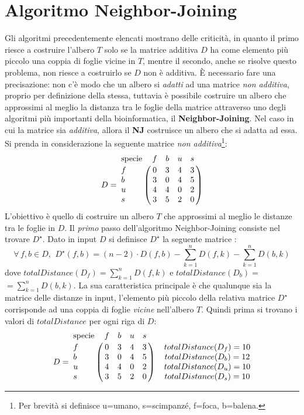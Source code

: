 \newpage

\section{Algoritmo Neighbor-Joining}
Gli algoritmi precedentemente elencati mostrano delle criticità, in quanto il primo riesce a costruire l'albero $T$ solo se la matrice additiva $D$ ha come elemento più piccolo una coppia di foglie vicine in $T$, mentre il secondo, anche se risolve questo problema, non riesce a costruirlo se $D$ non è additiva.
\newline
\`E necessario fare una precisazione: non c'è modo che un albero si \textit{adatti} ad una matrice \textit{non additiva}, proprio per definizione della stessa, tuttavia è possibile costruire un albero che approssimi al meglio la distanza tra le foglie della matrice attraverso uno degli algoritmi più importanti della bioinformatica, il \textbf{Neighbor-Joining}. Nel caso in cui la matrice sia \textit{additiva}, allora il \textbf{NJ} costruisce un albero che si adatta ad essa.
\newline
Si prenda in considerazione la seguente matrice \textit{non additiva}\footnote{Per brevità si definisce u=umano, s=scimpanzé, f=foca, b=balena.}:
\[
D = \bordermatrix{\text{specie}&f&b&u&s\cr
                f& 0 & 3 & 4 & 3\cr
                b& 3 & 0 & 4 & 5\cr
                u& 4 & 4 & 0 & 2\cr
                s& 3 & 5 & 2 & 0}
\]
L'obiettivo è quello di costruire un albero $T$ che approssimi al meglio le distanze tra le foglie in $D$.
\newline
Il \textit{primo} passo dell'algoritmo Neighbor-Joining consiste nel trovare $D^\star$. Dato in input $D$ si definisce $D^\star$ la seguente matrice \cite{neighborjoinrevealed}:
\[\forall \,f,b\in D,\: \, D^\star(f,b)=(n-2)\cdot D(f,b)-\sum_{k=1}^{n}D(f,k)-\sum_{k=1}^{n}D(b,k)\]
dove $totalDistance(D_f)=\sum_{k=1}^{n}D(f,k)$ e $totalDistance(D_b)=$\newline$=\sum_{k=1}^{n}D(b,k)$.
La sua caratteristica principale è che qualunque sia la matrice delle distanze in input, l'elemento più piccolo della relativa matrice $D^\star$ corrisponde ad una coppia di foglie \textit{vicine} nell'albero $T$. 
\newline
Quindi prima si trovano i valori di $totalDistance$ per ogni riga di $D$:
\[
D = \bordermatrix{\text{specie}&f&b&u&s\cr
                f& 0 & 3 & 4 & 3\cr
                b& 3 & 0 & 4 & 5\cr
                u& 4 & 4 & 0 & 2\cr
                s& 3 & 5 & 2 & 0}\;\;\;\;
\begin{matrix}
totalDistance(D_f)=10\\ 
totalDistance(D_b)=12\\ 
totalDistance(D_u)=10\\
totalDistance(D_s)=10
\end{matrix}
\]
